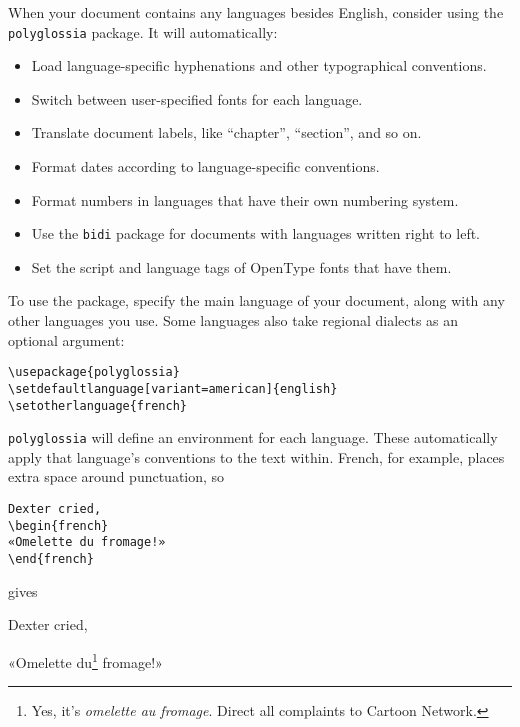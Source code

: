 When your document contains any languages besides English,
consider using the \texttt{polyglossia} package.
It will automatically:
\begin{itemize}
\item Load language-specific hyphenations and other typographical
    conventions.
\item Switch between user-specified fonts for each language.
\item Translate document labels,
    like ``chapter''\quotekern, ``section''\quotekern, and so on.
\item Format dates according to language-specific conventions.
\item Format numbers in languages that have their own numbering system.
\item Use the \texttt{bidi} package for documents with languages written
    right to left.
\item Set the script and language tags of OpenType fonts that have them.
\end{itemize}
To use the package, specify the main language of your document,
along with any other languages you use.
Some languages also take regional dialects as an optional argument:
\begin{leftfigure}
\begin{lstlisting}
\usepackage{polyglossia}
\setdefaultlanguage[variant=american]{english}
\setotherlanguage{french}
\end{lstlisting}
\end{leftfigure}
\texttt{polyglossia} will define an environment for each language.
These automatically apply that language's conventions to the text within.
French, for example, places extra space around punctuation, so
\begin{leftfigure}
\begin{lstlisting}
Dexter cried,
\begin{french}
«Omelette du fromage!»
\end{french}
\end{lstlisting}
\end{leftfigure}
gives
\begin{leftfigure}
\lm%
Dexter cried,
\begin{french}
\lm%
«Omelette du\footnote{Yes, it's \emph{omelette au fromage}.
Direct all complaints to Cartoon Network.} fromage!»
\end{french}
\end{leftfigure}


